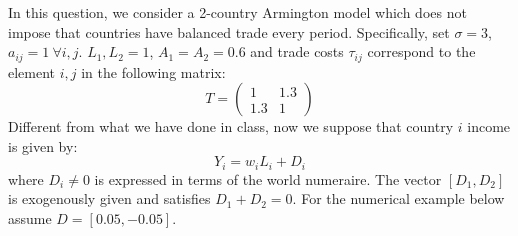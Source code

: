 \documentclass[answers]{exam}
\begin{document}
\begin{questions}
    \question In this question, we consider a 2-country Armington model which does not impose that countries have balanced trade every period. Specifically, set $\sigma = 3$, $a_{ij} = 1 \ \forall i,j$. $L_1,L_2 = 1$, $A_1 = A_2 = 0.6$ and trade costs $\tau_{ij}$ correspond to the element $i,j$ in the following matrix:
    $$T = \begin{pmatrix}
        1 & 1.3 \\
        1.3 & 1
        \end{pmatrix}$$
    Different from what we have done in class, now we suppose that country $i$ income is given by:
    $$Y_i = w_i L_i + D_i$$
    where $D_i \ne 0$ is expressed in terms of the world numeraire. The vector $[D_1, D_2]$ is exogenously given and satisfies $D_1 + D_2 = 0$. For the numerical example below assume $D = [0.05, -0.05]$.
    \begin{parts}

\end{parts}
\end{questions}
\end{document}
